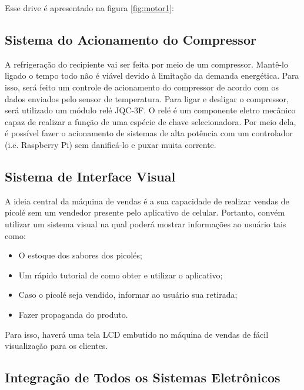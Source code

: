 Esse drive é apresentado na figura \ref{fig:motor1}:


\subsection{Sistema do Acionamento do Compressor}

A refrigeração do recipiente vai ser feita por meio de um compressor. Mantê-lo ligado o tempo todo não é viável devido à limitação da demanda energética. Para isso, será feito um controle de acionamento do compressor de acordo com os dados enviados pelo sensor de temperatura. Para ligar e desligar o compressor, será utilizado um módulo relé JQC-3F. O relé é um componente eletro mecânico capaz de realizar a função de uma espécie de chave selecionadora. Por meio dela, é possível fazer o acionamento de sistemas de alta potência com um controlador (i.e. Raspberry Pi) sem danificá-lo e puxar muita corrente.

\subsection{Sistema de Interface Visual}

A ideia central da máquina de vendas é a sua capacidade de realizar vendas de picolé sem um vendedor presente pelo aplicativo de celular. Portanto, convém utilizar um sistema visual na qual poderá mostrar informações ao usuário tais como:

\begin{itemize}
  \item O estoque dos sabores dos picolés;
  \item Um rápido tutorial de como obter e utilizar o aplicativo;
  \item Caso o picolé seja vendido, informar ao usuário sua retirada;
  \item Fazer propaganda do produto.
\end{itemize}

Para isso, haverá uma tela LCD embutido no máquina de vendas de fácil visualização para os clientes.

\subsection{Integração de Todos os Sistemas Eletrônicos}

